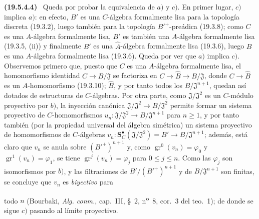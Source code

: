 \documentclass[10pt,oneside]{book}
\makeatletter
\newcommand{\gr}{\operatorname{gr}}
\newcommand{\setmanualcurrentlabel}[1]{\def\@currentlabel{#1}}
\newcommand{\oldpage}[2][]{%
  \setcounter{footnote}{0}%
  \marginpar{\scriptsize\textbf{#1}~|~#2}\ignorespaces}
\newenvironment{env}[1][]{\setmanualcurrentlabel{#1}\par\medskip\noindent\textbf{(#1)}\ }{\par}
\makeatother
\begin{document}
\begin{env}[19.5.4.4]
\label{0.19.5.4.4-es}
Queda por probar la equivalencia de $a)$ y $c)$. En primer lugar, $c)$ implica
$a)$: en efecto, $B'$ es una $C$-álgebra formalmente lisa para la topología
discreta (19.3.2), luego también para la topología ${B'}^+$-preádica (19.3.8);
como $C$ es una $A$-álgebra formalmente lisa, $B'$ es también una
$A$-álgebra formalmente lisa (19.3.5, (ii)) y finalmente $\widehat B'$ es
una $\widehat A$-álgebra formalmente lisa (19.3.6), luego $B$ es una
$A$-álgebra formalmente lisa (19.3.6). Queda por ver que $a)$ implica $c)$.
Observemos primero que, puesto que $C$ es una $A$-álgebra formalmente lisa,
el homomorfismo identidad $C\to B/\mathfrak J$ se factoriza en
$C\to\widehat B\to B/\mathfrak J$, donde $C\to\widehat B$ es un
$A$-homomorfismo (19.3.10); $\widehat B$, y por tanto todos los
$B/\mathfrak J^{n+1}$, quedan así dotados de estructuras de $C$-álgebras. Por otra
parte, como $\mathfrak J/\mathfrak J^2$ es un $C$-módulo proyectivo por $b)$,
la inyección canónica $\mathfrak J/\mathfrak J^2\to B/\mathfrak J^2$ permite
formar un sistema proyectivo de $C$-homomorfismos
$u_n:\mathfrak J/\mathfrak J^2\to B/\mathfrak J^{n+1}$ para $n\geq1$, y por
tanto también (por la propiedad universal del álgebra simétrica) un sistema
proyectivo de homomorfismos de $C$-álgebras
$v_n:\mathbf S_C^\bullet(\mathfrak J/\mathfrak J^2)=B'\to B/\mathfrak J^{n+1}$;
además, está claro que $v_n$ se anula sobre $({B'}^+)^{n+1}$ y, como
$\gr^0(v_n)=\varphi_0$ y $\gr^1(v_n)=\varphi_1$, se tiene
$\gr^j(v_n)=\varphi_j$ para $0\leq j\leq n$. Como las $\varphi_j$ son
isomorfismos por $b)$, y las filtraciones de
$B'/({B'}^+)^{n+1}$ y de $B/\mathfrak J^{n+1}$ son finitas, se concluye que
$v_n$ es \emph{biyectivo} para

\oldpage[0\textsubscript{IV-1}]{94}

todo $n$ (Bourbaki, \emph{Alg. conm.}, cap.~III, §~2,
n\textsuperscript{o}~8, cor.~3 del teo.~1); de donde se sigue $c)$ pasando al límite
proyectivo.
\end{env}
\end{document}
